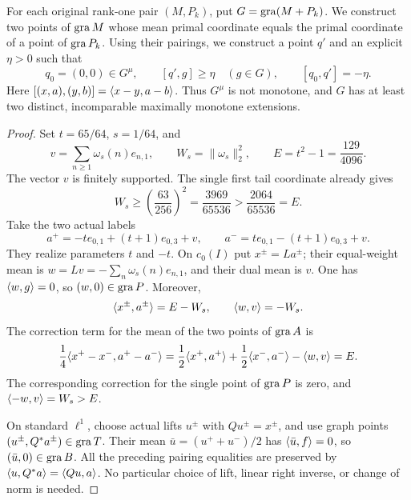\begin{corollary}
\label{cor:incompatible}
For each original rank-one pair $(M,P_k)$, put
$G=\operatorname{gra}(M+P_k)$. We construct two points of $\operatorname{gra} M$ whose mean primal
coordinate equals the primal coordinate of a point of $\operatorname{gra} P_k$.
Using their pairings, we construct a point $q'$ and an explicit $\eta>0$ such that
\begin{equation}
q_0=(0,0)\in G^\mu,\qquad
[q',g]\ge\eta\quad(g\in G),\qquad
[q_0,q']=-\eta.
\label{eq:cor-incompatible}
\end{equation}
Here $[(x,a),(y,b)]=\langle x-y,a-b\rangle$.
Thus $G^\mu$ is not monotone, and $G$ has at least two distinct,
incomparable maximally monotone extensions.
\end{corollary}
\begin{proof}
Set $t=65/64$, $s=1/64$, and
\[
v=\sum_{n\ge1}\omega_s(n)e_{n,1},\qquad
W_s=\|\omega_s\|_2^2,\qquad E=t^2-1=\frac{129}{4096}.
\]
The vector $v$ is finitely supported. The single first tail coordinate
already gives
\[
W_s\ge\left(\frac{63}{256}\right)^2
  =\frac{3969}{65536}>\frac{2064}{65536}=E.
\]
Take the two actual labels
\[
a^+=-t e_{0,1}+(t+1)e_{0,3}+v,
\qquad
a^-=t e_{0,1}-(t+1)e_{0,3}+v.
\]
They realize parameters $t$ and $-t$. On $c_0(I)$ put
$x^\pm=La^\pm$; their equal-weight mean is
$w=Lv=-\sum_n\omega_s(n)e_{n,1}$, and their dual mean is $v$.
One has $\langle w,g\rangle=0$, so $(w,0)\in\operatorname{gra} P$.
Moreover,
\[
\langle x^\pm,a^\pm\rangle=E-W_s,\qquad
\langle w,v\rangle=-W_s.
\]
The correction term for the mean of the two points of $\operatorname{gra} A$ is
\[
\frac14\langle x^+-x^-,a^+-a^-\rangle
=\frac12\langle x^+,a^+\rangle+\frac12\langle x^-,a^-\rangle
  -\langle w,v\rangle=E.
\]
The corresponding correction for the single point of $\operatorname{gra} P$ is zero,
and $\langle -w,v\rangle=W_s>E$.

On standard $\ell^1$, choose actual lifts $u^\pm$ with
$Qu^\pm=x^\pm$, and use graph points $(u^\pm,Q^*a^\pm)\in\operatorname{gra} T$.
Their mean $\bar u=(u^++u^-)/2$ has
$\langle \bar u,f\rangle=0$, so $(\bar u,0)\in\operatorname{gra} B$.
All the preceding pairing equalities are preserved by
$\langle u,Q^*a\rangle=\langle Qu,a\rangle$. No particular choice of lift,
linear right inverse, or change of norm is needed.


\end{proof}
